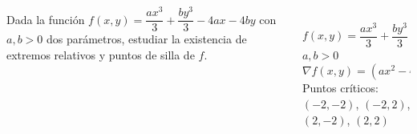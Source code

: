 \documentclass[aspectratio=149,10pt,xcolor=dvipsnames,t]{beamer}
\begin{document}
\begin{frame}
\begin{columns}
\begin{column}[T]{0.6\textwidth}
Dada la función $f(x, y) = \dfrac{ax^3}{3} + \dfrac{by^3}{3}-4ax-4by$ con $a,b>0$ dos parámetros, estudiar la
existencia de extremos relativos y puntos de silla de $f$.
\end{column}
\begin{column}[T]{0.4\textwidth}
\\
$f(x, y) = \dfrac{ax^3}{3} + \dfrac{by^3}{3}-2ax-2by$\\
$a,b>0$\\
$\nabla f(x,y)=(ax^2-4a,by^2-4b)$\\
Puntos críticos: $(-2,-2)$, $(-2,2)$, $(2,-2)$, $(2,2)$
\end{column}
\end{columns}
\end{frame}
\end{document}

